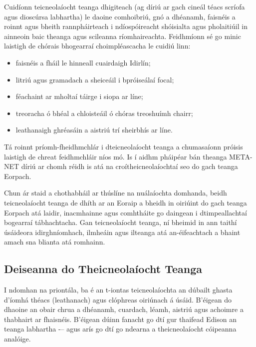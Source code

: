 \begin{multicols}{2}
Cuidíonn teicneolaíocht teanga dhigiteach (ag díriú ar gach cineál téacs scríofa agus dioscúrsa labhartha) le daoine comhoibriú, gnó a dhéanamh, faisnéis a roinnt agus bheith rannpháirteach i ndíospóireacht shóisialta agus pholaitiúil in ainneoin baic theanga agus scileanna ríomhaireachta. Feidhmíonn sé go minic laistigh de chórais bhogearraí choimpléascacha le cuidiú linn:

\begin{itemize}
\item faisnéis a fháil le hinneall cuairdaigh Idirlín;
\item litriú agus gramadach a sheiceáil i bpróiseálaí focal;
\item féachaint ar mholtaí táirge i siopa ar líne;
\item treoracha ó bhéal a chloisteáil ó chóras treoshuímh chairr;
\item leathanaigh ghréasáin a aistriú trí sheirbhís ar líne. 
\end{itemize}

Tá roinnt príomh-fheidhmchlár i dteicneolaíocht teanga a chumasaíonn próisis laistigh de chreat feidhmchláir níos mó. Is í aidhm pháipéar bán theanga META-NET díriú ar chomh réidh is atá na croítheicneolaíochtaí seo do gach teanga Eorpach.  


Chun ár staid a chothabháil ar thúslíne na nuálaíochta domhanda, beidh teicneolaíocht teanga de dhíth ar an Eoraip a bheidh in oiriúint do gach teanga Eorpach atá laidir, inacmhainne agus comhtháite go daingean i dtimpeallachtaí bogearraí tábhachtacha. Gan teicneolaíocht teanga, ní bheimid in ann taithí úsáideora idirghníomhach, ilmheáin agus ilteanga atá an-éifeachtach a bhaint amach sna blianta atá romhainn.

\subsection{Deiseanna do Theicneolaíocht Teanga}

I ndomhan na priontála, ba é an t-iontas teicneolaíochta an dúbailt ghasta d'íomhá théacs (leathanach) agus clóphreas oiriúnach á úsáid. B’éigean do dhaoine an obair chrua a dhéanamh, cuardach, léamh, aistriú agus achoimre a thabhairt ar fhaisnéis. B’éigean dúinn fanacht go dtí gur thaifead Edison an teanga labhartha -– agus arís go dtí go ndearna a theicneolaíocht cóipeanna analóige.


\end{multicols}

